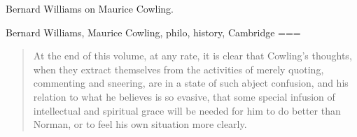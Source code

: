 Bernard Williams on Maurice Cowling.

Bernard Williams, Maurice Cowling, philo, history, Cambridge
===
\begin{quote}
At the end of this volume, at any rate, it is clear that Cowling’s thoughts, when they extract themselves from the activities of merely quoting, commenting and sneering, are in a state of such abject confusion, and his relation to what he believes is so evasive, that some special infusion of intellectual and spiritual grace will be needed for him to do better than Norman, or to feel his own situation more clearly.
\end{quote}
\nocite{williams1981}